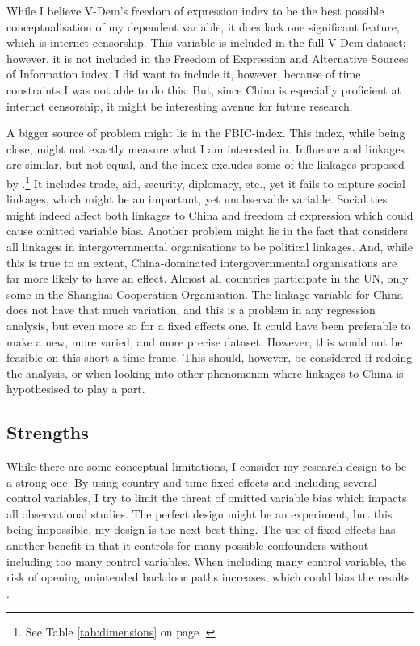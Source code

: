 While I believe V-Dem's freedom of expression index to be the best possible conceptualisation of my dependent variable, it does lack one significant feature, which is internet censorship. This variable is included in the full V-Dem dataset; however, it is not included in the Freedom of Expression and Alternative Sources of Information index. I did want to include it, however, because of time constraints I was not able to do this. But, since China is especially proficient at internet censorship, it might be interesting avenue for future research.

A bigger source of problem might lie in the FBIC-index. This index, while being close, might not exactly measure what I am interested in. Influence and linkages are similar, but not equal, and the index excludes some of the linkages proposed by \citet{levitsky_competitive_2010}.\footnote{See Table \ref{tab:dimensions} on page \pageref{tab:dimensions}.} It includes trade, aid, security, diplomacy, etc., yet it fails to capture social linkages, which might be an important, yet unobservable variable. Social ties might indeed affect both linkages to China and freedom of expression which could cause omitted variable bias. Another problem might lie in the fact that \citep{moyer_china-us_2021} considers all linkages in intergovernmental organisations to be political linkages. And, while this is true to an extent, China-dominated intergovernmental organisations are far more likely to have an effect. Almost all countries participate in the UN, only some in the Shanghai Cooperation Organisation. The linkage variable for China does not have that much variation, and this is a problem in any regression analysis, but even more so for a fixed effects one. It could have been preferable to make a new, more varied, and more precise dataset. However, this would not be feasible on this short a time frame. This should, however, be considered if redoing the analysis, or when looking into other phenomenon where linkages to China is hypothesised to play a part.

\subsection{Strengths}
While there are some conceptual limitations, I consider my research design to be a strong one. By using country and time fixed effects and including several control variables, I try to limit the threat of omitted variable bias which impacts all observational studies. The perfect design might be an experiment, but this being impossible, my design is the next best thing. The use of fixed-effects has another benefit in that it controls for many possible confounders without including too many control variables. When including many control variable, the risk of opening unintended backdoor paths increases, which could bias the results \citep[Chapter 3]{cunningham_causal_2021}.

